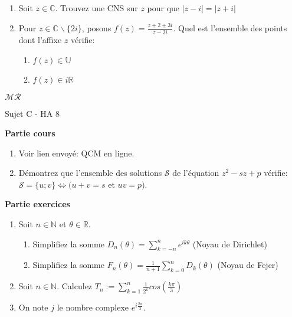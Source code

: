 \documentclass[a4paper,11pt, landscape]{article}
\begin{document}
\begin{multicols*}{3}
\begin{enumerate}[leftmargin=*]
\begin{enumerate}
  \item Soit $z \in \mathbb{C}$. Trouvez une CNS sur $z$ pour que $|z-i| = |z+i|$
  \item Pour $z \in \mathbb{C} \smallsetminus\{2i\}$, posons $f(z) = \frac{z+2+3i}{z-2i}$. Quel est l'ensemble des points dont l'affixe $z$ vérifie: 
  \begin{enumerate}
    \item $f(z) \in \mathbb{U}$
    \item $f(z) \in i\mathbb{R}$
  \end{enumerate}
\end{enumerate}

\end{enumerate}
\centerline{$\mathcal{MR}$}
\vfill\null
\columnbreak
\centerline{Sujet C - HA 8}
\begin{flushleft}
  \textbf{Partie cours} 
\end{flushleft} 
\begin{enumerate}[leftmargin=*]
  \item Voir lien envoyé: QCM en ligne.
  \item Démontrez que l'ensemble des solutions $\mathcal{S}$ de l'équation $z^2-sz+p$ vérifie: $\mathcal{S} = \{u;v\} \Leftrightarrow (u+v = s$ et $uv = p)$.
\end{enumerate}
\textbf{Partie exercices}
\begin{enumerate}[leftmargin=*]
  \item Soit $n \in \mathbb{N}$ et $\theta \in \mathbb{R}$.
  \begin{enumerate}
    \item Simplifiez la somme $D_n(\theta) = \sum\limits_{k=-n}^{n}e^{ik\theta}$ (Noyau de Dirichlet)
    \item Simplifiez la somme $F_n(\theta) = \frac{1}{n+1} \sum\limits_{k=0}^{n}D_k(\theta)$ (Noyau de Fejer)
  \end{enumerate}
  \item Soit $n \in \mathbb{N}$. Calculez $T_n := \sum\limits_{k=1}^{n}\frac{1}{2^k}cos\left(\frac{k\pi}{3}\right)$
  \item On note $j$ le nombre complexe $e^{i\frac{2\pi}{3}}$.
  \begin{enumerate}

\end{enumerate}
\end{enumerate}
\end{multicols*}
\end{document}
